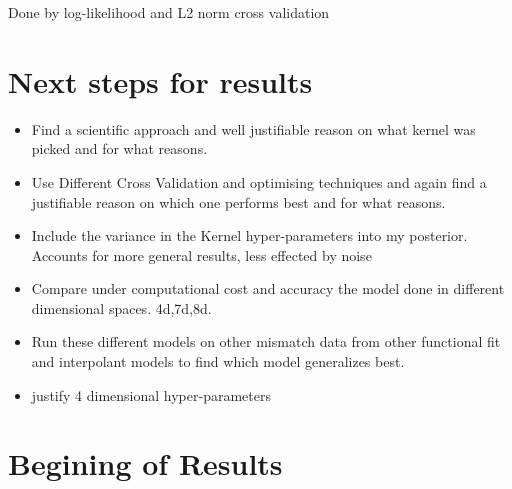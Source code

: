 \documentclass{article}
\begin{document}

\noindent
Done by log-likelihood and L2 norm cross validation


\section{Next steps for results}

\begin{itemize}
     \item Find a scientific approach and well justifiable reason on what kernel was picked and for what reasons.
     \item Use Different Cross Validation and optimising techniques and again find a justifiable reason on which one performs best and for what reasons.
     \item Include the variance in the Kernel hyper-parameters into my posterior. Accounts for more general results, less effected by noise
    \item Compare under computational cost and accuracy the model done in different dimensional spaces. 4d,7d,8d.
    \item Run these different models on other mismatch data from other functional fit and interpolant models to find which model generalizes best.
    \item justify 4 dimensional hyper-parameters
\end{itemize}


\section{Begining of Results}
\end{document}
